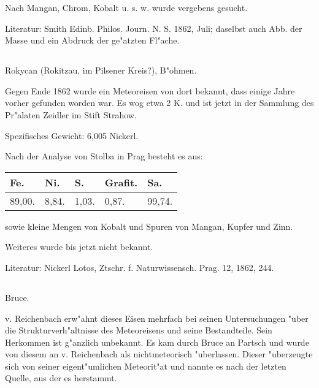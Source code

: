 \documentclass[a4paper, 11pt, oneside]{article}
\begin{document}
Nach Mangan, Chrom, Kobalt u. s. w. wurde vergebens gesucht.

\normalsize
Literatur: Smith Edinb. Philos. Journ. N. S. 1862, Juli; daselbst auch Abb. der Masse und ein Abdruck der ge"atzten Fl"ache.

\subsection{}
\LARGE
\paragraph{}
Rokycan (Rokitzau, im Pilsener Kreis?), B"ohmen.

Gegen Ende 1862 wurde ein Meteoreisen von dort bekannt, dass einige Jahre vorher gefunden worden war. Es wog etwa 2 K. und ist jetzt in der Sammlung des Pr"alaten Zeidler im Stift Strahow.

Spezifisches Gewicht: 6,005 Nickerl.

Nach der Analyse von Stolba in Prag besteht es aus:
\begin{table}[H]
    \centering\swabfamily\Large
    \begin{tabular}{l l l l l}
        Fe. & Ni. & S. & Grafit. & Sa. \\ \hline
        89,00. & 8,84. & 1,03. & 0,87. & 99,74. \\
    \end{tabular}
\end{table}

sowie kleine Mengen von Kobalt und Spuren von Mangan, Kupfer und Zinn.

Weiteres wurde bis jetzt nicht bekannt.

\normalsize
Literatur: Nickerl Lotos, Ztschr. f. Naturwissensch. Prag. 12, 1862, 244.

\subsection{}
\LARGE
\paragraph{}
Bruce.

v. Reichenbach erw"ahnt dieses Eisen mehrfach bei seinen Untersuchungen "uber die Strukturverh"altnisse des Meteoreisens und seine Bestandteile. Sein Herkommen ist g"anzlich unbekannt. Es kam durch Bruce an Partsch und wurde von diesem an v. Reichenbach als nichtmeteorisch "uberlassen. Dieser "uberzeugte sich von seiner eigent"umlichen Meteorit"at und nannte es nach der letzten Quelle, aus der es herstammt.
\end{document}
